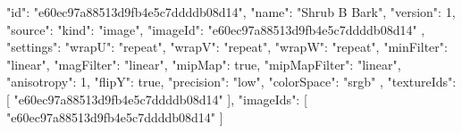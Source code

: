 {
  "id": "e60ec97a88513d9fb4e5c7ddddb08d14",
  "name": "Shrub B Bark",
  "version": 1,
  "source": {
    "kind": "image",
    "imageId": "e60ec97a88513d9fb4e5c7ddddb08d14"
  },
  "settings": {
    "wrapU": "repeat",
    "wrapV": "repeat",
    "wrapW": "repeat",
    "minFilter": "linear",
    "magFilter": "linear",
    "mipMap": true,
    "mipMapFilter": "linear",
    "anisotropy": 1,
    "flipY": true,
    "precision": "low",
    "colorSpace": "srgb"
  },
  "textureIds": [
    "e60ec97a88513d9fb4e5c7ddddb08d14"
  ],
  "imageIds": [
    "e60ec97a88513d9fb4e5c7ddddb08d14"
  ]
}
